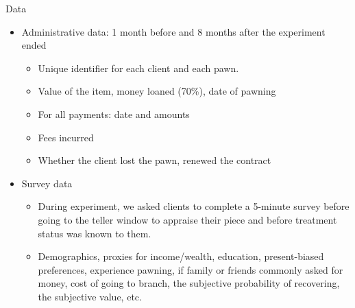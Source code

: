 \documentclass[8pt]{beamer}
\begin{document}
\begin{frame}{Data}
\label{data}
\begin{itemize}
    \item Administrative data: 1 month before and 8 months after the experiment ended
    \begin{itemize}
        \item Unique identifier for each client and each pawn.
        \item Value of the item, money loaned (70\%), date of pawning
        \item For all payments: date and amounts
        \item Fees incurred
        \item Whether the client lost the pawn, renewed the contract
    \end{itemize} 

    \vfill \item Survey data
    \begin{itemize}
        \item During experiment, we asked clients to complete a 5-minute survey before going to the teller window to appraise their piece and before treatment status was known to them.
        \item Demographics, proxies for income/wealth, education, present-biased preferences, experience pawning, if family or friends commonly asked for money, cost of going to branch, the subjective probability of recovering, the subjective value, etc.
    \end{itemize}
\end{itemize}    
\end{frame}
\end{document}
